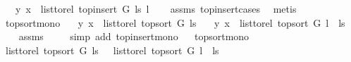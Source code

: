 \begin{isabellebody}
\ \ \ {\isachardoublequoteopen}{\isacharparenleft}{\kern0pt}y{\isacharcomma}{\kern0pt}\ x{\isacharparenright}{\kern0pt}\ {\isasymnotin}\ list{\isacharunderscore}{\kern0pt}to{\isacharunderscore}{\kern0pt}rel\ {\isacharparenleft}{\kern0pt}top{\isacharunderscore}{\kern0pt}insert\ G\ ls\ l{\isacharparenright}{\kern0pt}{\isachardoublequoteclose}\isanewline
%
\isadelimproof
\ \ %
\endisadelimproof
%
\isatagproof
{}\isamarkupfalse%
\ assms\ top{\isacharunderscore}{\kern0pt}insert{\isacharunderscore}{\kern0pt}cases\ \isamarkupfalse%
\ metis%
\endisatagproof
{\isafoldproof}%
%
\isadelimproof
\isanewline
%
\endisadelimproof
\isanewline
{}\isamarkupfalse%
\ top{\isacharunderscore}{\kern0pt}sort{\isacharunderscore}{\kern0pt}mono{\isacharcolon}{\kern0pt}\isanewline
\ \ \ {\isachardoublequoteopen}{\isacharparenleft}{\kern0pt}y{\isacharcomma}{\kern0pt}\ x{\isacharparenright}{\kern0pt}\ {\isasymin}\ list{\isacharunderscore}{\kern0pt}to{\isacharunderscore}{\kern0pt}rel\ {\isacharparenleft}{\kern0pt}top{\isacharunderscore}{\kern0pt}sort\ G\ ls{\isacharparenright}{\kern0pt}{\isachardoublequoteclose}\isanewline
\ \ \ {\isachardoublequoteopen}{\isacharparenleft}{\kern0pt}y{\isacharcomma}{\kern0pt}\ x{\isacharparenright}{\kern0pt}\ {\isasymin}\ list{\isacharunderscore}{\kern0pt}to{\isacharunderscore}{\kern0pt}rel\ {\isacharparenleft}{\kern0pt}top{\isacharunderscore}{\kern0pt}sort\ G\ {\isacharparenleft}{\kern0pt}l\ {\isacharhash}{\kern0pt}\ ls{\isacharparenright}{\kern0pt}{\isacharparenright}{\kern0pt}{\isachardoublequoteclose}\isanewline
%
\isadelimproof
\ \ %
\endisadelimproof
%
\isatagproof
{}\isamarkupfalse%
\ assms\ \isanewline
\ \ \isamarkupfalse%
\ {\isacharparenleft}{\kern0pt}simp\ add{\isacharcolon}{\kern0pt}\ top{\isacharunderscore}{\kern0pt}insert{\isacharunderscore}{\kern0pt}mono{\isacharparenright}{\kern0pt}%
\endisatagproof
{\isafoldproof}%
%
\isadelimproof
\ \isanewline
%
\endisadelimproof
\isanewline
\isanewline
\isanewline
{}\isamarkupfalse%
\ top{\isacharunderscore}{\kern0pt}sort{\isacharunderscore}{\kern0pt}mono{}{\isacharcolon}{\kern0pt}\isanewline
\ {\isachardoublequoteopen}list{\isacharunderscore}{\kern0pt}to{\isacharunderscore}{\kern0pt}rel\ {\isacharparenleft}{\kern0pt}top{\isacharunderscore}{\kern0pt}sort\ G\ ls{\isacharparenright}{\kern0pt}\ {\isasymsubseteq}\ \ list{\isacharunderscore}{\kern0pt}to{\isacharunderscore}{\kern0pt}rel\ {\isacharparenleft}{\kern0pt}top{\isacharunderscore}{\kern0pt}sort\ G\ {\isacharparenleft}{\kern0pt}l\ {\isacharhash}{\kern0pt}\ ls{\isacharparenright}{\kern0pt}{\isacharparenright}{\kern0pt}{\isachardoublequoteclose}\isanewline

\end{isabellebody}
